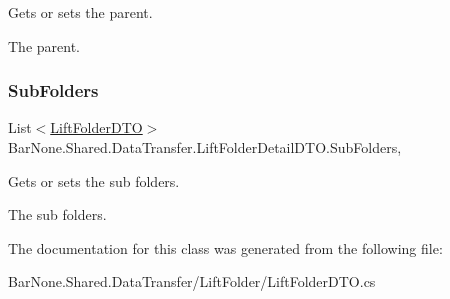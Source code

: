 Gets or sets the parent. 

The parent. \mbox{\label{class_bar_none_1_1_shared_1_1_data_transfer_1_1_lift_folder_detail_d_t_o_a47e6be9f7dd6059f50e226daff4729a9}} 
\subsubsection{\texorpdfstring{Sub\+Folders}{SubFolders}}
{\footnotesize\ttfamily List$<$\mbox{\hyperlink{class_bar_none_1_1_shared_1_1_data_transfer_1_1_lift_folder_d_t_o}{Lift\+Folder\+D\+TO}}$>$ Bar\+None.\+Shared.\+Data\+Transfer.\+Lift\+Folder\+Detail\+D\+T\+O.\+Sub\+Folders\hspace{0.3cm}{\ttfamily [get]}, {\ttfamily [set]}}



Gets or sets the sub folders. 

The sub folders. 

The documentation for this class was generated from the following file\+:\begin{DoxyCompactItemize}
\item 
Bar\+None.\+Shared.\+Data\+Transfer/\+Lift\+Folder/Lift\+Folder\+D\+T\+O.\+cs\end{DoxyCompactItemize}
